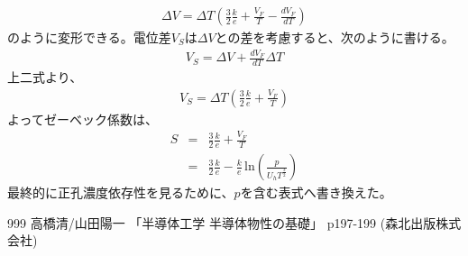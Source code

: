 \documentclass[10pt,a4paper]{jarticle} %
\begin{document}
\begin{eqnarray}
\Delta V = \Delta T \left( \frac{3}{2}\frac{k}{e} + \frac{V_F}{T} - \frac{dV_F}{dT} \right)
\end{eqnarray}
のように変形できる。電位差$V_S$は$\Delta V$との差を考慮すると、次のように書ける。
\begin{eqnarray}
V_S = \Delta V + \frac{dV_F}{dT}\Delta T
\end{eqnarray}
上二式より、
\begin{eqnarray}
V_S = \Delta T \left(\frac{3}{2}\frac{k}{e} + \frac{V_F}{T} \right)
\end{eqnarray}
よってゼーベック係数は、
\begin{eqnarray}
S &=& \frac{3}{2}\frac{k}{e} + \frac{V_F}{T}  \\
&=& \frac{3}{2}\frac{k}{e} - \frac{k}{e} \, \mathrm{ln} \left( \frac{p}{U_h T^{\frac{3}{2}}} \right)
\end{eqnarray}
最終的に正孔濃度依存性を見るために、$p$を含む表式へ書き換えた。

\begin{thebibliography}{999}
 高橋清/山田陽一 「半導体工学 半導体物性の基礎」 p197-199 (森北出版株式会社)
\end{thebibliography}
\end{document}
